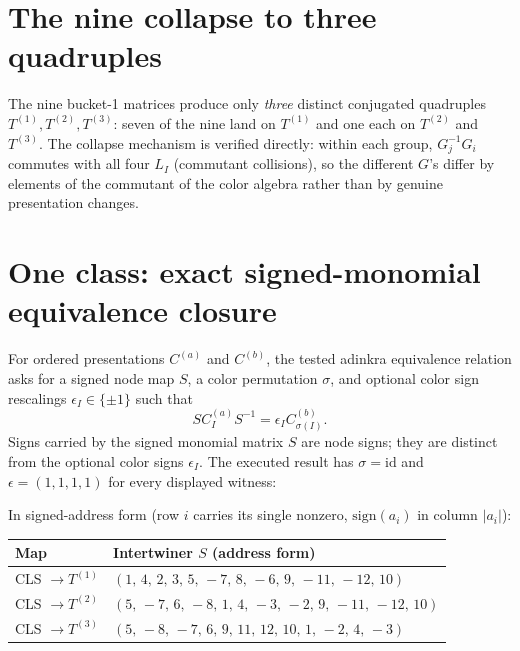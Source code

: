 \documentclass[11pt]{article}
\begin{document}
\section{The nine collapse to three quadruples}

The nine bucket-1 matrices produce only \emph{three} distinct conjugated
quadruples $T^{(1)}, T^{(2)}, T^{(3)}$: seven of the nine land on $T^{(1)}$
and one each on $T^{(2)}$ and $T^{(3)}$.  The collapse mechanism is verified
directly: within each group, $G_j^{-1} G_i$ commutes with all four $L_I$
(commutant collisions), so the different $G$'s differ by elements of the
commutant of the color algebra rather than by genuine presentation changes.

\section{One class: exact signed-monomial equivalence closure}

For ordered presentations $C^{(a)}$ and $C^{(b)}$, the tested adinkra
equivalence relation asks for a signed node map $S$, a color permutation
$\sigma$, and optional color sign rescalings $\epsilon_I\in\{\pm1\}$ such
that
\[
  S C^{(a)}_I S^{-1}=\epsilon_I C^{(b)}_{\sigma(I)}.
\]
Signs carried by the signed monomial matrix $S$ are node signs; they are
distinct from the optional color signs $\epsilon_I$.  The executed result has
$\sigma=\mathrm{id}$ and $\epsilon=(1,1,1,1)$ for every displayed witness:

\begin{center}
\end{center}

\noindent In signed-address form (row $i$ carries its single nonzero,
$\mathrm{sign}(a_i)$ in column $|a_i|$):

\begin{center}
\small
\begin{tabular}{@{}ll@{}}
\toprule
Map & Intertwiner $S$ (address form) \\
\midrule
CLS $\to T^{(1)}$ & $(1,\,4,\,2,\,3,\,5,\,-7,\,8,\,-6,\,9,\,-11,\,-12,\,10)$ \\
CLS $\to T^{(2)}$ & $(5,\,-7,\,6,\,-8,\,1,\,4,\,-3,\,-2,\,9,\,-11,\,-12,\,10)$ \\
CLS $\to T^{(3)}$ & $(5,\,-8,\,-7,\,6,\,9,\,11,\,12,\,10,\,1,\,-2,\,4,\,-3)$ \\
\bottomrule
\end{tabular}
\end{center}
\end{document}
